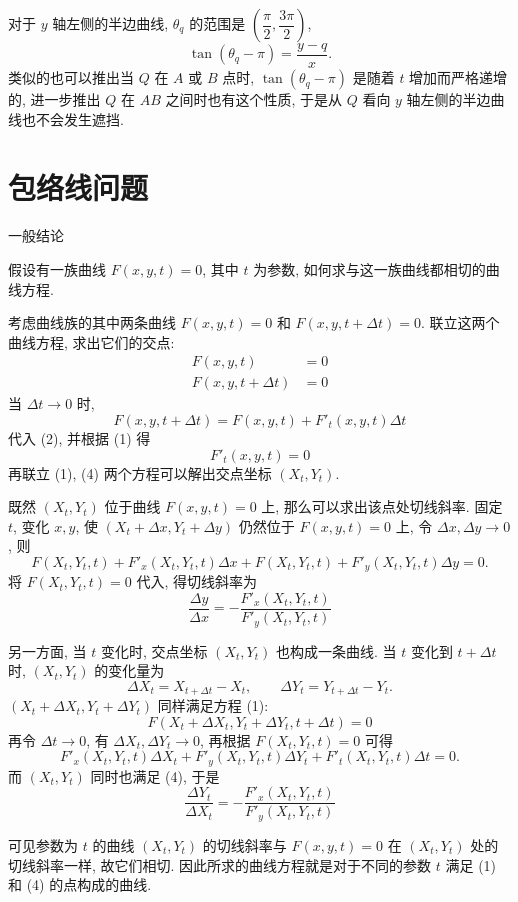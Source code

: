 对于 $y$ 轴左侧的半边曲线, $\theta_q$ 的范围是 $(\dfrac{\pi}{2}, \dfrac{3\pi}{2})$, 
\[ \tan(\theta_q-\pi) = \frac{y-q}{x}.\]
类似的也可以推出当 $Q$ 在 $A$ 或 $B$ 点时, $\tan(\theta_q-\pi)$ 是随着 $t$ 增加而严格递增的, 进一步推出 $Q$ 在 $AB$ 之间时也有这个性质, 于是从 $Q$ 看向 $y$ 轴左侧的半边曲线也不会发生遮挡.

\newpage
\section{包络线问题}

\noindent 一般结论

假设有一族曲线 $F(x,y,t)=0$, 其中 $t$ 为参数, 如何求与这一族曲线都相切的曲线方程.

考虑曲线族的其中两条曲线 $F(x,y,t)=0$ 和 $F(x,y,t+\Delta t)=0$. 联立这两个曲线方程, 求出它们的交点:
\begin{align*}
F(x,y,t) &= 0 \tag{1} \\
F(x,y,t+\Delta t) &= 0 \tag{2}
\end{align*}
当 $\Delta t\to 0$ 时, 
\[ F(x,y,t+\Delta t) = F(x,y,t) + F'_t(x,y,t)\Delta t  \tag{3} \] 
代入 (2), 并根据 (1) 得
\[ F'_t(x,y,t) = 0 \tag{4} \]
再联立 (1), (4) 两个方程可以解出交点坐标 $(X_t, Y_t)$.

既然 $(X_t, Y_t)$ 位于曲线 $F(x,y,t)=0$ 上, 那么可以求出该点处切线斜率. 固定 $t$, 变化 $x,y$, 使 $(X_t+\Delta x, Y_t + \Delta y)$ 仍然位于 $F(x,y,t)=0$ 上, 令 $\Delta x, \Delta y\to 0$, 则
\[ F(X_t,Y_t,t) + F'_x(X_t,Y_t,t)\Delta x + F(X_t,Y_t,t) + F'_y(X_t,Y_t,t)\Delta y = 0 .\]
将 $F(X_t,Y_t,t)=0$ 代入, 得切线斜率为
\[ \frac{\Delta y}{\Delta x} = -\frac{ F'_x(X_t,Y_t,t)}{ F'_y(X_t,Y_t,t)}  \tag{5}\]

另一方面, 当 $t$ 变化时, 交点坐标 $(X_t, Y_t)$ 也构成一条曲线. 当 $t$ 变化到 $t+\Delta t$ 时, $(X_t, Y_t)$ 的变化量为 
\[ \Delta X_t = X_{t+\Delta t} - X_t, \qquad \Delta Y_t =Y_{t+\Delta t} - Y_t .\]
$(X_t+\Delta X_t, Y_t+\Delta Y_t)$ 同样满足方程 (1): 
\[ F(X_t+\Delta X_t, Y_t+\Delta Y_t, t+\Delta t) = 0 \tag{6} \]
再令 $\Delta t \to 0$, 有 $\Delta X_t, \Delta Y_t\to 0$, 再根据 $F(X_t,Y_t,t)=0$ 可得
\[ F'_x(X_t, Y_t, t) \Delta X_t + F'_y(X_t, Y_t, t) \Delta Y_t +  F'_t(X_t, Y_t, t)\Delta t = 0.\]
而 $(X_t,Y_t)$ 同时也满足 (4), 于是
\[\frac{\Delta Y_t}{\Delta X_t} = -\frac{ F'_x(X_t,Y_t,t)}{ F'_y(X_t,Y_t,t)} \tag{7} \]

可见参数为 $t$ 的曲线 $(X_t, Y_t)$ 的切线斜率与 $F(x,y,t)=0$ 在 $(X_t, Y_t)$ 处的切线斜率一样, 故它们相切. 因此所求的曲线方程就是对于不同的参数 $t$ 满足 (1) 和 (4) 的点构成的曲线.

